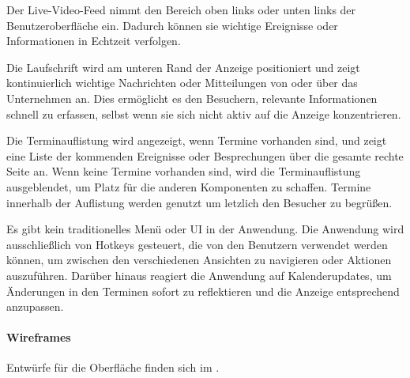 Der Live-Video-Feed nimmt den Bereich oben links oder unten links der Benutzeroberfläche ein.
Dadurch können sie wichtige Ereignisse oder Informationen in Echtzeit verfolgen.

Die Laufschrift wird am unteren Rand der Anzeige positioniert und zeigt kontinuierlich wichtige Nachrichten oder Mitteilungen von oder über das Unternehmen an.
Dies ermöglicht es den Besuchern, relevante Informationen schnell zu erfassen, selbst wenn sie sich nicht aktiv auf die Anzeige konzentrieren.

Die Terminauflistung wird angezeigt, wenn Termine vorhanden sind, und zeigt eine Liste der kommenden Ereignisse oder Besprechungen über die gesamte rechte Seite an.
Wenn keine Termine vorhanden sind, wird die Terminauflistung ausgeblendet, um Platz für die anderen Komponenten zu schaffen.
Termine innerhalb der Auflistung werden genutzt um letzlich den Besucher zu begrüßen.

Es gibt kein traditionelles Menü oder \ac{UI} in der Anwendung.
Die Anwendung wird ausschließlich von Hotkeys gesteuert, die von den Benutzern verwendet werden können, um zwischen den verschiedenen Ansichten zu navigieren oder Aktionen auszuführen.
Darüber hinaus reagiert die Anwendung auf Kalenderupdates, um Änderungen in den Terminen sofort zu reflektieren und die Anzeige entsprechend anzupassen.

\paragraph{Wireframes}
Entwürfe für die Oberfläche finden sich im .


%
%
%


